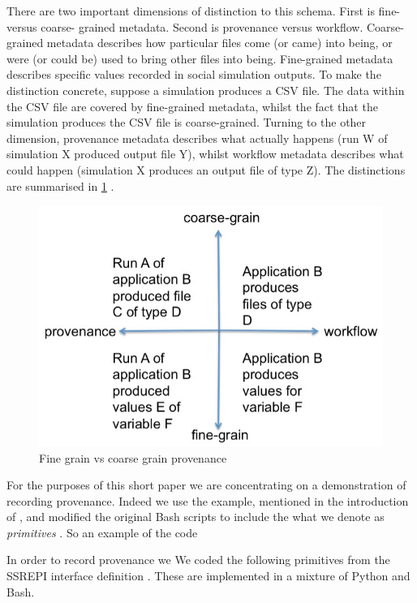 \documentclass[runningheads]{llncs}
\begin{document}
There are two important dimensions of distinction to this schema. First is
fine- versus coarse- grained metadata. Second is provenance versus
workflow. Coarse-grained metadata describes how particular files come (or
came) into being, or were (or could be) used to bring other files into
being. Fine-grained metadata describes specific values recorded in social
simulation outputs. To make the distinction concrete, suppose a simulation
produces a CSV file. The data within the CSV file are covered by
fine-grained metadata, whilst the fact that the simulation produces the
CSV file is coarse-grained. Turning to the other dimension, provenance
metadata describes what actually happens (run W of simulation X produced
output file Y), whilst workflow metadata describes what could happen
(simulation X produces an output file of type Z). The distinctions are
summarised in \ref{fig:finegrain} .

\begin{figure}
\includegraphics[width=\textwidth]{img/fine-grain-vs-coarse-grain.jpeg}
\caption{Fine grain vs coarse grain provenance} \label{fig:finegrain}
\end{figure}

For the purposes of this short paper we are concentrating on a
demonstration of recording provenance. Indeed we use the example,
mentioned in the introduction of \cite{polhill2022miracle}, and modified the original Bash \cite{bash4420} scripts to include the what we denote as \textit{primitives} . So an example of the code 

In order to record provenance we 
We coded the following primitives from
the SSREPI interface definition \cite{polhill2022miracle}. These are implemented in a mixture of Python and Bash.
\end{document}
